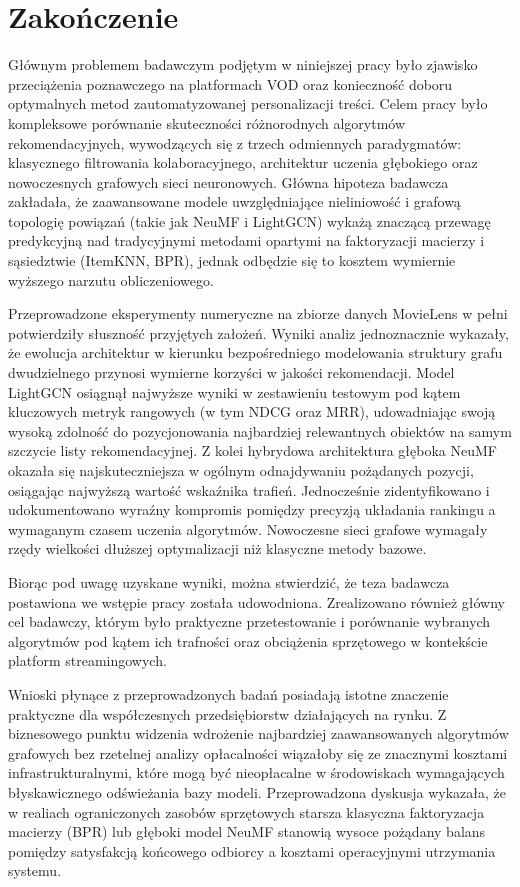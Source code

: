 \section*{Zakończenie} 

Głównym problemem badawczym podjętym w niniejszej pracy było zjawisko przeciążenia poznawczego na platformach VOD oraz konieczność doboru optymalnych metod zautomatyzowanej personalizacji treści. Celem pracy było kompleksowe porównanie skuteczności różnorodnych algorytmów rekomendacyjnych, wywodzących się z trzech odmiennych paradygmatów: klasycznego filtrowania kolaboracyjnego, architektur uczenia głębokiego oraz nowoczesnych grafowych sieci neuronowych. Główna hipoteza badawcza zakładała, że zaawansowane modele uwzględniające nieliniowość i grafową topologię powiązań (takie jak NeuMF i LightGCN) wykażą znaczącą przewagę predykcyjną nad tradycyjnymi metodami opartymi na faktoryzacji macierzy i sąsiedztwie (ItemKNN, BPR), jednak odbędzie się to kosztem wymiernie wyższego narzutu obliczeniowego.

Przeprowadzone eksperymenty numeryczne na zbiorze danych MovieLens w pełni potwierdziły słuszność przyjętych założeń. Wyniki analiz jednoznacznie wykazały, że ewolucja architektur w kierunku bezpośredniego modelowania struktury grafu dwudzielnego przynosi wymierne korzyści w jakości rekomendacji. Model LightGCN osiągnął najwyższe wyniki w zestawieniu testowym pod kątem kluczowych metryk rangowych (w tym NDCG oraz MRR), udowadniając swoją wysoką zdolność do pozycjonowania najbardziej relewantnych obiektów na samym szczycie listy rekomendacyjnej. Z kolei hybrydowa architektura głęboka NeuMF okazała się najskuteczniejsza w ogólnym odnajdywaniu pożądanych pozycji, osiągając najwyższą wartość wskaźnika trafień. Jednocześnie zidentyfikowano i udokumentowano wyraźny kompromis pomiędzy precyzją układania rankingu a wymaganym czasem uczenia algorytmów. Nowoczesne sieci grafowe wymagały rzędy wielkości dłuższej optymalizacji niż klasyczne metody bazowe.

Biorąc pod uwagę uzyskane wyniki, można stwierdzić, że teza badawcza postawiona we wstępie pracy została udowodniona. Zrealizowano również główny cel badawczy, którym było praktyczne przetestowanie i porównanie wybranych algorytmów pod kątem ich trafności oraz obciążenia sprzętowego w kontekście platform streamingowych.

Wnioski płynące z przeprowadzonych badań posiadają istotne znaczenie praktyczne dla współczesnych przedsiębiorstw działających na rynku. Z biznesowego punktu widzenia wdrożenie najbardziej zaawansowanych algorytmów grafowych bez rzetelnej analizy opłacalności wiązałoby się ze znacznymi kosztami infrastrukturalnymi, które mogą być nieopłacalne w środowiskach wymagających błyskawicznego odświeżania bazy modeli. Przeprowadzona dyskusja wykazała, że w realiach ograniczonych zasobów sprzętowych starsza klasyczna faktoryzacja macierzy (BPR) lub głęboki model NeuMF stanowią wysoce pożądany balans pomiędzy satysfakcją końcowego odbiorcy a kosztami operacyjnymi utrzymania systemu.


